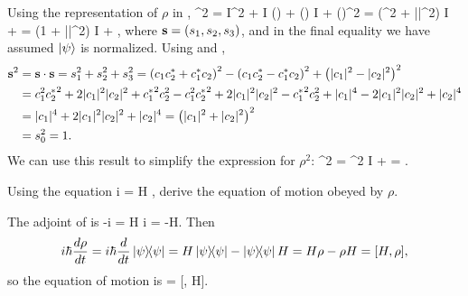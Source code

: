 \begin{solution}
	Using the representation of $\rho$ in ,
	\beq
		\rho^2 =  I^2 +  I (\sds) +  (\sds) I +  (\sds)^2
		=  (\soo^2 + |\vs|^2) I +  \sds
		=  (1 + |\vs|^2) I +  \sds,
	\eeq
	where $\mathbf{s} = (s_1, s_2, s_3)$, and in the final equality we have assumed $\ket{\psi}$ is normalized.  Using  and ,
	\begin{align*}
		\mathbf{s}^2 &= \mathbf{s} \cdot \mathbf{s} = s_1^2 + s_2^2 + s_3^2
		= \left( c_1 c_2^* + c_1^* c_2 \right)^2 - \left( c_1 c_2^* - c_1^* c_2 \right)^2 + \left( |c_1|^2 - |c_2|^2 \right)^2 \\
		&= c_1^2 {c_2^*}^2 + 2 |c_1|^2 |c_2|^2 + {c_1^*}^2 c_2^2 - c_1^2 {c_2^*}^2 + 2 |c_1|^2 |c_2|^2 - {c_1^*}^2 c_2^2 + |c_1|^4 - 2 |c_1|^2 |c_2|^2 + |c_2|^4 \\
		&= |c_1|^4 + 2 |c_1|^2 |c_2|^2 + |c_2|^4
		= \left( |c_1|^2 + |c_2|^2 \right)^2 \\
		&= s_0^2 = 1.
	\end{align*}
	We can use this result to simplify the expression for $\rho^2$:
	\beq
		\rho^2 =  \soo^2 I +  \sds = \rho.
	\eeq
\vfix
\end{solution}

\newcommand{\bpsi}{\bra{\psi}}
\newcommand{\rhot}{\rho(t)}

\begin{problem}
	Using the {\Schrodinger} equation
	\beqn \label{schro}
		i \hbar {} \kpsi = H \kpsi,
	\eeqn
	derive the equation of motion obeyed by $\rho$.
\end{problem}

\begin{solution}
	The adjoint of  is
	\beq
		-i \hbar {} \bpsi = \bpsi H
		\iff
		i \hbar {} \bpsi = -\bpsi H.
	\eeq
	Then
	\begin{align*}
		i \hbar \dv{\rho}{t} = i \hbar \dv{}{t} \ketbra{\psi}
		= H \ketbra{\psi} - \ketbra{\psi} H
		= H \rho - \rho H
		= [H, \rho],
	\end{align*}
	so the equation of motion is
	\beq
		 =  [\rho, H].
	\eeq
\vfix
\end{solution}

\newcommand{\vOme}{\boldsymbol{\Omega}}
\newcommand{\psiu}{\psi_\up}
\newcommand{\psid}{\psi_\dn}
\newcommand{\psiut}{\psiu(t)}
\newcommand{\psidt}{\psid(t)}
\newcommand{\kpsit}{\ket{\psit}}
\newcommand{\Ods}{\vOme \cdot \vsig}
\newcommand{\Omx}{\Omega_x}
\newcommand{\Omy}{\Omega_y}
\newcommand{\Omz}{\Omega_z}

